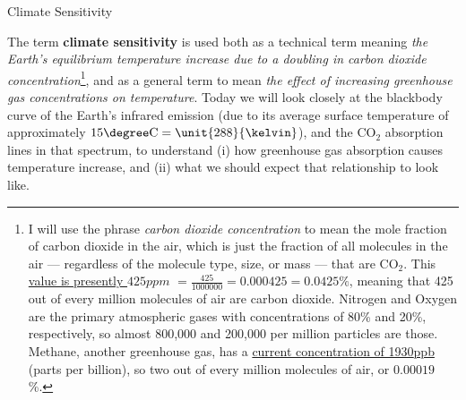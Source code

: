 \documentclass[12pt]{article}
\begin{document}
\begin{center}
{\Large Climate Sensitivity}
\end{center}

The term {\bf climate sensitivity} is used both as a technical term meaning {\em the Earth's equilibrium temperature increase due to a doubling in carbon dioxide concentration}\footnote{I will use the phrase {\em carbon dioxide concentration} to mean the mole fraction of carbon dioxide in the air, which is just the fraction of all molecules in the air --- regardless of the molecule type,  size, or mass --- that are $\text{CO}_2$. This \href{https://gml.noaa.gov/ccgg/trends/}{value is presently $\unit{425}{ppm}$} $ = \frac{425}{1000000} = 0.000425 = 0.0425\%$, meaning that 425 out of every million molecules of air are carbon dioxide. Nitrogen and Oxygen are the primary atmospheric gases with concentrations of 80\% and 20\%, respectively, so almost 800,000 and 200,000 per million particles are those.  Methane, another greenhouse gas, has a \href{https://gml.noaa.gov/ccgg/trends_ch4/}{current concentration of \unit{1930}{ppb}} (parts per billion), so two out of every million molecules of air, or  $0.00019$\%.}, and as a general term to mean {\em the effect of increasing greenhouse gas concentrations on temperature}. Today we will look closely at the blackbody curve of the Earth's infrared emission (due to its average surface temperature of approximately $15\degree \text{C} = \unit{288}{\kelvin}$), and the $\text{CO}_2$ absorption lines in that spectrum, to understand (i) how greenhouse gas absorption causes temperature increase, and (ii) what we should expect that relationship to look like.

%
\end{document}
